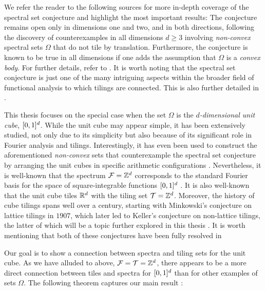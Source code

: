 \documentclass[../thesis.tex]{subfiles}
\begin{document}
We refer the reader to the following sources for more in-depth coverage of the spectral set conjecture and highlight the most important results: The conjecture remains open only in dimensions one and two, and in both directions, following the discovery of counterexamples in all dimensions $d \geq 3$ involving \emph{non-convex} spectral sets $\Omega$ that do not tile by translation. Furthermore, the conjecture is known to be true in all dimensions if one adds the assumption that $\Omega$ is a \emph{convex body}. For further details, refer to \cite{levFugledeConjectureConvex2022,dutkayReductionsSpectralSet2014,liDualityPropertiesSpectra2010,farkasFugledeConjectureExistence2006,kolountzakisStudyTranslationalTiling2003,jorgensenSpectralPairsCartesian2001}. It is worth noting that the spectral set conjecture is just one of the many intriguing aspects within the broader field of functional analysis to which tilings are connected. This is also further detailed in \cite{kolountzakisStudyTranslationalTiling2003}. 

This thesis focuses on the special case when the set $\Omega$ is the \emph{$d$-dimensional unit cube}, $[0,1]^d$. While the unit cube may appear simple, it has been extensively studied, not only due to its simplicity but also because of its significant role in Fourier analysis and tilings. Interestingly, it has even been used to construct the aforementioned \emph{non-convex} sets that counterexample the spectral set conjecture by arranging the unit cubes in specific arithmetic configurations \cite{levFugledeConjectureConvex2022}. Nevertheless, it is well-known that the spectrum $\mathcal{F}=\mathbb{Z}^d$ corresponds to the standard Fourier basis for the space of square-integrable functions  $[0,1]^d$ \cite{lagariasOrthonormalBasesExponentials2000}. It is also well-known that the unit cube tiles $\mathbb{R}^d$ with the tiling set $\mathcal{T}=\mathbb{Z}^d$. Moreover, the history of cube tilings spans well over a century, starting with Minkowski's conjecture on lattice tilings in $1907$, which later led to Keller's conjecture on non-lattice tilings, the latter of which will be a topic further explored in this thesis \cite{liDualityPropertiesSpectra2010,iosevichSpectralTilingProperties1998}. It is worth mentioning that both of these conjectures have been fully resolved in 

Our goal is to show a connection between spectra and tiling sets for the unit cube. As we have alluded to above, $\mathcal{F}=\mathcal{T}=\mathbb{Z}^d$, there appears to be a more direct connection between tiles and spectra for $[0,1]^d$ than for other examples of sets $\Omega$. The following theorem captures our main result \cite{iosevichSpectralTilingProperties1998}:
\end{document}
